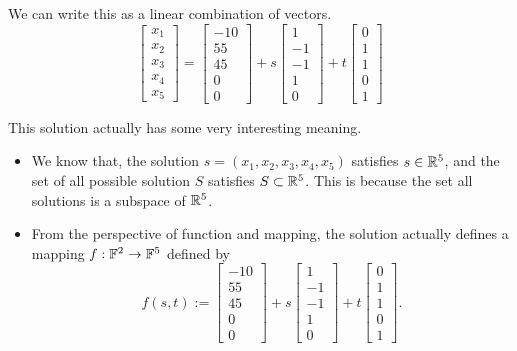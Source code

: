 \documentclass[12pt,a4paper]{article}
\begin{document}
\begin{solution}
We can write this as a linear combination of vectors.
\[
\begin{bmatrix}
x_1 \\
x_2 \\
x_3 \\
x_4 \\
x_5
\end{bmatrix}
=
\begin{bmatrix}
-10 \\
55 \\
45 \\
0 \\
0
\end{bmatrix}
+
s \begin{bmatrix}
1 \\
-1 \\
-1 \\
1 \\
0
\end{bmatrix}
+
t \begin{bmatrix}
0 \\
1 \\
1 \\
0 \\
1
\end{bmatrix}
\]
\begin{remark}
This solution actually has some very interesting meaning. 
\begin{itemize}
    \item We know that, the solution $s = (x_1, x_2, x_3, x_4, x_5)$ satisfies $s \in \mathbb{R}^5$, and the set of all possible solution $S$ satisfies $S \subset \mathbb{R}^5$. This is because the set all solutions is a subspace of $\mathbb{R}^5$.
    \item From the perspective of function and mapping, the solution actually defines a mapping $f:\mathbb{F}^2 \to \mathbb{F}^5$ defined by 
    $$f(s,t) := \begin{bmatrix}
-10 \\
55 \\
45 \\
0 \\
0
\end{bmatrix}
+
s \begin{bmatrix}
1 \\
-1 \\
-1 \\
1 \\
0
\end{bmatrix}
+
t \begin{bmatrix}
0 \\
1 \\
1 \\
0 \\
1
\end{bmatrix}.$$


\end{itemize}
\end{remark}
\end{solution}
\end{document}
